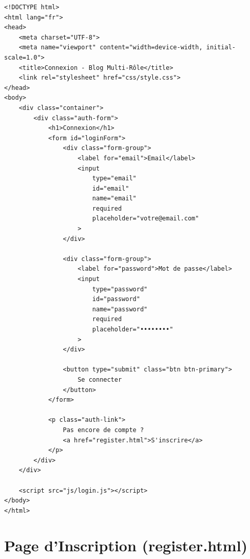 \begin{lstlisting}[style=html, caption=public/login.html - Page de connexion]
<!DOCTYPE html>
<html lang="fr">
<head>
    <meta charset="UTF-8">
    <meta name="viewport" content="width=device-width, initial-scale=1.0">
    <title>Connexion - Blog Multi-Rôle</title>
    <link rel="stylesheet" href="css/style.css">
</head>
<body>
    <div class="container">
        <div class="auth-form">
            <h1>Connexion</h1>
            <form id="loginForm">
                <div class="form-group">
                    <label for="email">Email</label>
                    <input 
                        type="email" 
                        id="email" 
                        name="email" 
                        required
                        placeholder="votre@email.com"
                    >
                </div>
                
                <div class="form-group">
                    <label for="password">Mot de passe</label>
                    <input 
                        type="password" 
                        id="password" 
                        name="password" 
                        required
                        placeholder="••••••••"
                    >
                </div>
                
                <button type="submit" class="btn btn-primary">
                    Se connecter
                </button>
            </form>
            
            <p class="auth-link">
                Pas encore de compte ? 
                <a href="register.html">S'inscrire</a>
            </p>
        </div>
    </div>
    
    <script src="js/login.js"></script>
</body>
</html>
\end{lstlisting}

\section{Page d'Inscription (register.html)}


